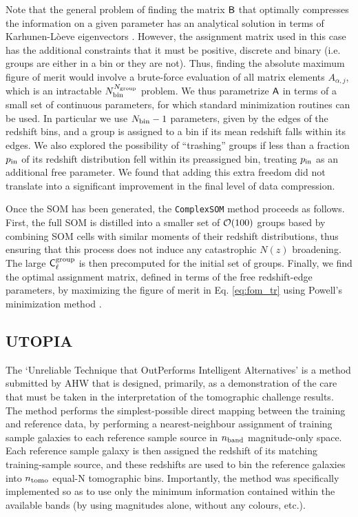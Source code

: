 \documentclass[twocolumn,twocolappendix]{aastex63}
\begin{document}
Note that the general problem of finding the matrix ${\sf B}$ that optimally
compresses the information on a given parameter has an analytical solution in
terms of Karhunen-L\`oeve eigenvectors \citep{astro-ph/9603021}. However, the
assignment matrix used in this case has the additional constraints that it
must be positive, discrete and binary (i.e. groups are either in a bin or they
are not). Thus, finding the absolute maximum figure of merit would involve a
brute-force evaluation of all matrix elements $A_{\alpha,j}$, which is an
intractable $N_{\rm bin}^{N_{\rm group}}$ problem. We thus parametrize ${\sf
A}$ in terms of a small set of continuous parameters, for which standard
minimization routines can be used. In particular we use $N_{\rm bin}-1$
parameters, given by the edges of the redshift bins, and a group is assigned
to a bin if its mean redshift falls within its edges. We also explored the
possibility of ``trashing'' groups if less than a fraction $p_{\rm in}$ of its
redshift distribution fell within its preassigned bin, treating $p_{\rm in}$
as an additional free parameter. We found that adding this extra freedom did
not translate into a significant improvement in the final level of data
compression.

Once the SOM has been generated, the {\tt ComplexSOM} method proceeds as
follows. First, the full SOM is distilled into a smaller set of ${\cal O}(100)$
groups based by combining SOM cells with similar moments of their redshift
distributions, thus ensuring that this process does not induce any catastrophic
$N(z)$ broadening.
The large ${\sf C}^{\rm group}_\ell$ is then precomputed for the initial set of
groups. Finally, we find the optimal assignment matrix, defined in terms of the
free redshift-edge parameters, by maximizing the figure of merit in Eq.
\ref{eq:fom_tr} using Powell's minimization method
\citep{10.1093/comjnl/7.2.155}.




\subsection{ {\sc UTOPIA} }\label{sec:utopia}

The `Unreliable Technique that OutPerforms Intelligent Alternatives' is a method
submitted by AHW that is designed,  primarily, as a demonstration of the care
that must be taken in the interpretation of the tomographic challenge results. 
The method performs  the simplest-possible direct mapping between the training
and reference data, by performing a nearest-neighbour  assignment of training
sample galaxies to each reference sample source in $n_{\rm band}$ magnitude-only
space. Each reference  sample galaxy is then assigned the redshift of its
matching training-sample source, and these redshifts are  used to bin the
reference galaxies into $n_{\rm tomo}$ equal-N tomographic bins. Importantly,
the method was specifically  implemented so as to use only the minimum
information contained within the available bands (by using magnitudes alone,
without  any colours, etc.). 
\end{document}
